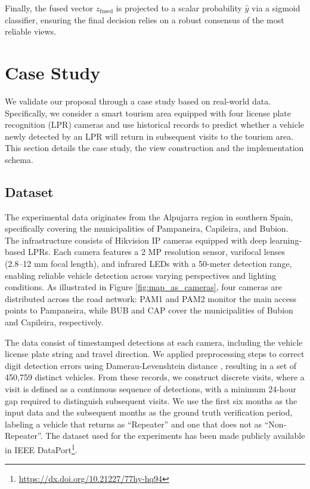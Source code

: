 \documentclass[journal]{IEEEtran}
\begin{document}
Finally, the fused vector $z_{\text{fused}}$ is projected to a scalar probability $\hat{y}$ via a sigmoid classifier, ensuring the final decision relies on a robust consensus of the most reliable views.


\section{Case Study}  \label{sec:case_study}

We validate our proposal through a case study based on real-world data. Specifically, we consider a smart tourism area equipped with four license plate recognition (LPR) cameras and use historical records to predict whether a vehicle newly detected by an LPR will return in subsequent visits to the tourism area. This section details the case study, the view construction and the implementation schema.



\subsection{Dataset} \label{subsec:case_study}

The experimental data originates from the Alpujarra region in southern Spain, specifically covering the municipalities of Pampaneira, Capileira, and Bubion. The infrastructure consists of Hikvision IP cameras equipped with deep learning-based LPRs. Each camera features a 2 MP resolution sensor, varifocal lenses (2.8--12 mm focal length), and infrared LEDs with a 50-meter detection range, enabling reliable vehicle detection across varying perspectives and lighting conditions. As illustrated in Figure \ref{fig:map_as_cameras}, four cameras are distributed across the road network: PAM1 and PAM2 monitor the main access points to Pampaneira, while BUB and CAP cover the municipalities of Bubion and Capileira, respectively.

The data consist of timestamped detections at each camera, including the vehicle license plate string and travel direction. We applied preprocessing steps to correct digit detection errors using Damerau-Levenshtein distance \cite{duran2024routerecoverer}, resulting in a set of 450,759 distinct vehicles. From these records, we construct discrete visits, where a visit is defined as a continuous sequence of detections, with a minimum 24-hour gap required to distinguish subsequent visits. We use the first six months as the input data and the subsequent months as the ground truth verification period, labeling a vehicle that returns as ``Repeater'' and one that does not as ``Non-Repeater''. The dataset used for the experiments has been made publicly available in IEEE DataPort\footnote{\url{https://dx.doi.org/10.21227/77hy-hq94}}.
\end{document}
